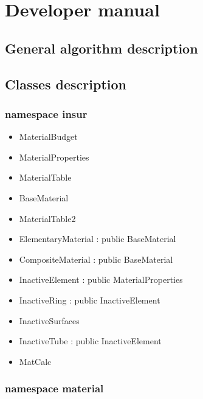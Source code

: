 \documentclass[12pt, a4paper]{article}
\begin{document}
\section{Developer manual}\label{sec:developerManual}

\subsection{General algorithm description}






\subsection{Classes description}

\subsubsection{namespace insur}

\begin{itemize}

\item MaterialBudget
\item MaterialProperties
\item MaterialTable
\item BaseMaterial
\item MaterialTable2
\item ElementaryMaterial : public BaseMaterial
\item CompositeMaterial : public BaseMaterial
\item InactiveElement : public MaterialProperties
\item InactiveRing : public InactiveElement
\item InactiveSurfaces
\item InactiveTube : public InactiveElement
\item MatCalc

\end{itemize}



\subsubsection{namespace material}
\end{document}
